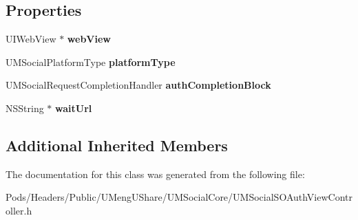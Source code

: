 \subsection*{Properties}
\begin{DoxyCompactItemize}
\item 
\mbox{\label{interface_u_m_social_s_o_auth_view_controller_ad4d60700dbfda22e697abb79f5510c1e}} 
U\+I\+Web\+View $\ast$ {\bfseries web\+View}
\item 
\mbox{\label{interface_u_m_social_s_o_auth_view_controller_ae8b420b3db3f0f0c635bd88bf6e8623d}} 
U\+M\+Social\+Platform\+Type {\bfseries platform\+Type}
\item 
\mbox{\label{interface_u_m_social_s_o_auth_view_controller_ae02054db99f841aaf846aff34d569c6b}} 
U\+M\+Social\+Request\+Completion\+Handler {\bfseries auth\+Completion\+Block}
\item 
\mbox{\label{interface_u_m_social_s_o_auth_view_controller_a9aaf1c0703f2661be7102dcdc54c9d13}} 
N\+S\+String $\ast$ {\bfseries wait\+Url}
\end{DoxyCompactItemize}
\subsection*{Additional Inherited Members}


The documentation for this class was generated from the following file\+:\begin{DoxyCompactItemize}
\item 
Pods/\+Headers/\+Public/\+U\+Meng\+U\+Share/\+U\+M\+Social\+Core/U\+M\+Social\+S\+O\+Auth\+View\+Controller.\+h\end{DoxyCompactItemize}
